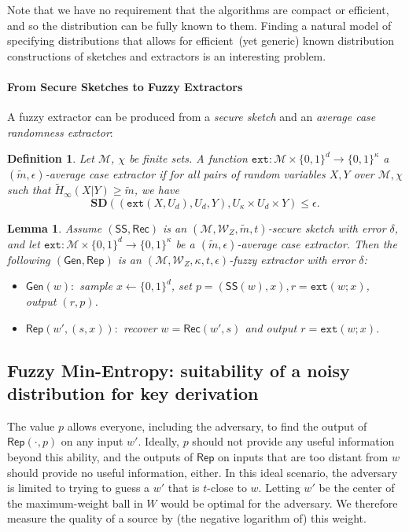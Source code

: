 \documentclass[11pt]{article}
\newtheorem{lemma}[theorem]{Lemma}
\newtheorem{definition}[theorem]{Definition}
\newcommand{\class}[1]{{\ensuremath{\mathsf{#1}}}}
\newcommand{\gen}{\ensuremath{\class{Gen}}\xspace}
\newcommand{\rep}{\ensuremath{\class{Rep}}\xspace}
\newcommand{\sketch}{\ensuremath{\class{SS}}\xspace}
\newcommand{\rec}{\ensuremath{\class{Rec}}\xspace}
\newcommand{\zo}{\ensuremath{\{0, 1\}}}
\newcommand{\ext}{\ensuremath{\mathtt{ext}}}
\newcommand{\sd}{\ensuremath{\mathbf{SD}}}
\begin{document}
Note that we have no requirement that the algorithms are compact or efficient, and so the distribution can be fully known to them. Finding a natural model of specifying distributions that allows for efficient~(yet generic) known distribution constructions of sketches and extractors is an interesting problem.  

\paragraph{From Secure Sketches to Fuzzy Extractors}
A fuzzy extractor can be produced from a \emph{secure sketch} and an \emph{average case randomness extractor}:

\begin{definition}
Let $\mathcal{M}$, $\chi$ be finite sets.
A function $\ext: \mathcal{M}\times \{0,1\}^d \rightarrow \{0,1\}^\kappa$ a \emph{$(\tilde{m}, \epsilon)$-average case extractor} if for all pairs
of random variables $X, Y$ over $\mathcal{M}, \chi$ such that
$\tilde{H}_\infty(X|Y) \ge \tilde{m}$, we have \[\sd((\ext(X, U_d), U_d, Y), U_\kappa\times
U_d \times Y) \le \epsilon.\]
\end{definition}

\begin{lemma}
\label{lem:fuzzy ext construction}
Assume $(\sketch, \rec)$ is an $(\mathcal{M}, \mathcal{W}_Z, \tilde{m}, t)$-secure sketch with error $\delta$, and let $\ext:\mathcal{M}\times \zo^d \rightarrow \zo^\kappa$ be a $(\tilde{m}, \epsilon)$-average case extractor.  Then the following $(\gen, \rep)$ is an $(\mathcal{M}, \mathcal{W}_Z, \kappa, t, \epsilon)$-fuzzy extractor with error $\delta$:
\begin{itemize}
\item $\gen(w):$ sample $x\leftarrow \zo^d$, set $p=(\sketch(w), x), r=\ext(w;x)$, output $(r,p)$.
\item $\rep(w', (s, x)):$ recover $w=\rec(w',s)$ and output $r=\ext(w;x)$.
\end{itemize}
\end{lemma}

\subsection{Fuzzy Min-Entropy: suitability of a noisy distribution for key derivation}
\label{sec:minimal conditions}
The value $p$ allows everyone, including the adversary, to find the output of $\rep(\cdot, p)$ on any input $w'$. Ideally,  $p$ should not provide any useful information beyond this ability, and the outputs of $\rep$ on inputs that are too distant from $w$ should provide no useful information, either.  In this ideal scenario, the adversary is limited to trying to guess a $w'$ that is $t$-close to $w$. 
Letting $w'$ be the center of the maximum-weight ball in $W$ would be optimal for the adversary.
We therefore measure the quality of a source by (the negative logarithm of) this weight.  
\end{document}
